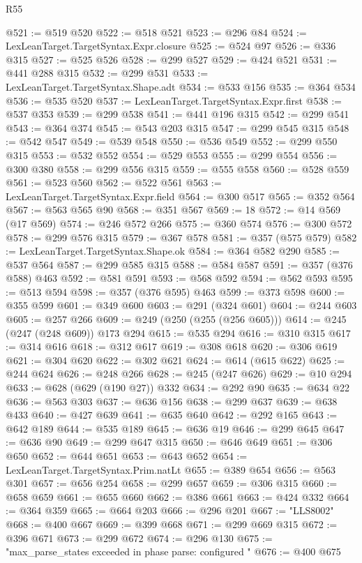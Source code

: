 \begin{lexlean}{R55}
\begin{coremodule}
@521 := @519 @520
@522 := @518 @521
@523 := @296 @84
@524 := LexLeanTarget.TargetSyntax.Expr.closure
@525 := @524 @97
@526 := @336 @315
@527 := @525 @526
@528 := @299 @527
@529 := @424 @521
@531 := @441 @288 @315
@532 := @299 @531
@533 := LexLeanTarget.TargetSyntax.Shape.adt
@534 := @533 @156
@535 := @364 @534
@536 := @535 @520
@537 := LexLeanTarget.TargetSyntax.Expr.first
@538 := @537 @353
@539 := @299 @538
@541 := @441 @196 @315
@542 := @299 @541
@543 := @364 @374
@545 := @543 @203 @315
@547 := @299 @545 @315
@548 := @542 @547
@549 := @539 @548
@550 := @536 @549
@552 := @299 @550 @315
@553 := @532 @552
@554 := @529 @553
@555 := @299 @554
@556 := @300 @380
@558 := @299 @556 @315
@559 := @555 @558
@560 := @528 @559
@561 := @523 @560
@562 := @522 @561
@563 := LexLeanTarget.TargetSyntax.Expr.field
@564 := @300 @517
@565 := @352 @564
@567 := @563 @565 @90
@568 := @351 @567
@569 := 18
@572 := @14 @569 (@17 @569)
@574 := @246 @572 @266
@575 := @360 @574
@576 := @300 @572
@578 := @299 @576 @315
@579 := @367 @578
@581 := @357 (@575 @579)
@582 := LexLeanTarget.TargetSyntax.Shape.ok
@584 := @364 @582 @290
@585 := @537 @564
@587 := @299 @585 @315
@588 := @584 @587
@591 := @357 (@376 @588) @463
@592 := @581 @591
@593 := @568 @592
@594 := @562 @593
@595 := @513 @594
@598 := @357 (@376 @595) @463
@599 := @373 @598
@600 := @355 @599
@601 := @349 @600
@603 := @291 (@324 @601)
@604 := @244 @603
@605 := @257 @266
@609 := @249 (@250 (@255 (@256 @605)))
@614 := @245 (@247 (@248 @609)) @173 @294
@615 := @535 @294
@616 := @310 @315
@617 := @314 @616
@618 := @312 @617
@619 := @308 @618
@620 := @306 @619
@621 := @304 @620
@622 := @302 @621
@624 := @614 (@615 @622)
@625 := @244 @624
@626 := @248 @266
@628 := @245 (@247 @626)
@629 := @10 @294
@633 := @628 (@629 (@190 @27)) @332
@634 := @292 @90
@635 := @634 @22
@636 := @563 @303
@637 := @636 @156
@638 := @299 @637
@639 := @638 @433
@640 := @427 @639
@641 := @635 @640
@642 := @292 @165
@643 := @642 @189
@644 := @535 @189
@645 := @636 @19
@646 := @299 @645
@647 := @636 @90
@649 := @299 @647 @315
@650 := @646 @649
@651 := @306 @650
@652 := @644 @651
@653 := @643 @652
@654 := LexLeanTarget.TargetSyntax.Prim.natLt
@655 := @389 @654
@656 := @563 @301
@657 := @656 @254
@658 := @299 @657
@659 := @306 @315
@660 := @658 @659
@661 := @655 @660
@662 := @386 @661
@663 := @424 @332
@664 := @364 @359
@665 := @664 @203
@666 := @296 @201
@667 := "LLS8002"
@668 := @400 @667
@669 := @399 @668
@671 := @299 @669 @315
@672 := @396 @671
@673 := @299 @672
@674 := @296 @130
@675 := "max_parse_states exceeded in phase parse: configured "
@676 := @400 @675

\end{coremodule}
\end{lexlean}
